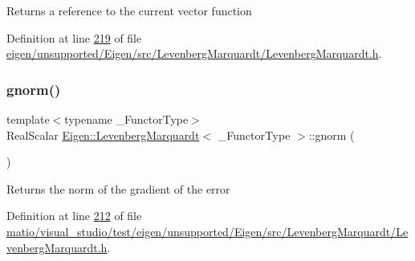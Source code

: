 \begin{DoxyReturn}{Returns}
a reference to the current vector function 
\end{DoxyReturn}


Definition at line \hyperlink{eigen_2unsupported_2_eigen_2src_2_levenberg_marquardt_2_levenberg_marquardt_8h_source_l00219}{219} of file \hyperlink{eigen_2unsupported_2_eigen_2src_2_levenberg_marquardt_2_levenberg_marquardt_8h_source}{eigen/unsupported/\+Eigen/src/\+Levenberg\+Marquardt/\+Levenberg\+Marquardt.\+h}.

\mbox{\label{class_eigen_1_1_levenberg_marquardt_ab91ec0507fb508a2402ac0dfa15af776}} 
\subsubsection{\texorpdfstring{gnorm()}{gnorm()}\hspace{0.1cm}{\footnotesize\ttfamily [1/2]}}
{\footnotesize\ttfamily template$<$typename \+\_\+\+Functor\+Type$>$ \\
Real\+Scalar \hyperlink{class_eigen_1_1_levenberg_marquardt}{Eigen\+::\+Levenberg\+Marquardt}$<$ \+\_\+\+Functor\+Type $>$\+::gnorm (\begin{DoxyParamCaption}{ }\end{DoxyParamCaption})\hspace{0.3cm}{\ttfamily [inline]}}

\begin{DoxyReturn}{Returns}
the norm of the gradient of the error 
\end{DoxyReturn}


Definition at line \hyperlink{matio_2visual__studio_2test_2eigen_2unsupported_2_eigen_2src_2_levenberg_marquardt_2_levenberg_marquardt_8h_source_l00212}{212} of file \hyperlink{matio_2visual__studio_2test_2eigen_2unsupported_2_eigen_2src_2_levenberg_marquardt_2_levenberg_marquardt_8h_source}{matio/visual\+\_\+studio/test/eigen/unsupported/\+Eigen/src/\+Levenberg\+Marquardt/\+Levenberg\+Marquardt.\+h}.

\mbox{\label{class_eigen_1_1_levenberg_marquardt_ab91ec0507fb508a2402ac0dfa15af776}} 
